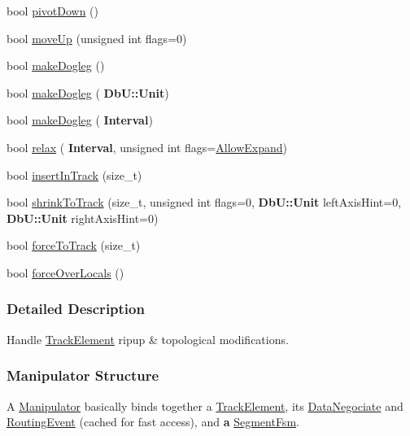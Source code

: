 \begin{DoxyCompactItemize}
\item 
bool \mbox{\hyperlink{classKite_1_1Manipulator_ac3b48ad16d9b9b63d1c68e526ceb42e8}{pivot\+Down}} ()
\item 
bool \mbox{\hyperlink{classKite_1_1Manipulator_ac954731e16188acb6984f348bf2d9d20}{move\+Up}} (unsigned int flags=0)
\item 
bool \mbox{\hyperlink{classKite_1_1Manipulator_af4d93a43ea18ae124da71072c66d1e0a}{make\+Dogleg}} ()
\item 
bool \mbox{\hyperlink{classKite_1_1Manipulator_a97e56b831481ef65309f6e3b7e3f4f3d}{make\+Dogleg}} (\textbf{ Db\+U\+::\+Unit})
\item 
bool \mbox{\hyperlink{classKite_1_1Manipulator_af7b3305693dab195d0c5d075821fbb30}{make\+Dogleg}} (\textbf{ Interval})
\item 
bool \mbox{\hyperlink{classKite_1_1Manipulator_a8b5b69fd5762d5a0cbc4ceea4d1b68c1}{relax}} (\textbf{ Interval}, unsigned int flags=\mbox{\hyperlink{classKite_1_1Manipulator_a2af2ad6b6441614038caf59d04b3b217a41880b9f6652400677e21c8681f97675}{Allow\+Expand}})
\item 
bool \mbox{\hyperlink{classKite_1_1Manipulator_a7140b507da2cab137d968a037bed19df}{insert\+In\+Track}} (size\+\_\+t)
\item 
bool \mbox{\hyperlink{classKite_1_1Manipulator_aba69c61ccb330e26aaa8211f0454795f}{shrink\+To\+Track}} (size\+\_\+t, unsigned int flags=0, \textbf{ Db\+U\+::\+Unit} left\+Axis\+Hint=0, \textbf{ Db\+U\+::\+Unit} right\+Axis\+Hint=0)
\item 
bool \mbox{\hyperlink{classKite_1_1Manipulator_a76d3956660cfa624696e2a5f2916cd22}{force\+To\+Track}} (size\+\_\+t)
\item 
bool \mbox{\hyperlink{classKite_1_1Manipulator_add26b688d75a99a1ae781787eead08d5}{force\+Over\+Locals}} ()
\end{DoxyCompactItemize}


\subsubsection{Detailed Description}
Handle \mbox{\hyperlink{classKite_1_1TrackElement}{Track\+Element}} ripup \& topological modifications. 

\hypertarget{classKite_1_1Manipulator_secManipStruct}{}\subsubsection{Manipulator Structure}\label{classKite_1_1Manipulator_secManipStruct}
A \mbox{\hyperlink{classKite_1_1Manipulator}{Manipulator}} basically binds together a \mbox{\hyperlink{classKite_1_1TrackElement}{Track\+Element}}, it\textquotesingle{}s \mbox{\hyperlink{classKite_1_1DataNegociate}{Data\+Negociate}} and \mbox{\hyperlink{classKite_1_1RoutingEvent}{Routing\+Event}} (cached for fast access), and {\bfseries a} \mbox{\hyperlink{classKite_1_1SegmentFsm}{Segment\+Fsm}}.

